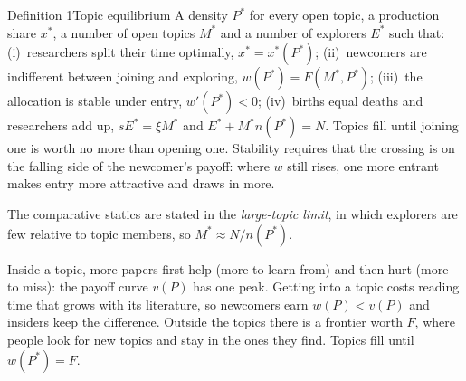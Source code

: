 \begin{resultbox}{Definition 1}{Topic equilibrium}{}
A density $P^*$ for every open topic, a production share $x^*$, a number of open topics $M^*$ and a number of explorers $E^*$ such that:
(i)~researchers split their time optimally, $x^*=x^*(P^*)$;
(ii)~newcomers are indifferent between joining and exploring, $w(P^*)=F(M^*,P^*)$;
(iii)~the allocation is stable under entry, $w'(P^*)<0$;
(iv)~births equal deaths and researchers add up, $sE^*=\xi M^*$ and $E^*+M^*n(P^*)=N$.
\tcblower
\inwords Topics fill until joining one is worth no more than opening one. Stability requires that the crossing is on the falling side of the newcomer's payoff: where $w$ still rises, one more entrant makes entry more attractive and draws in more.

The comparative statics are stated in the \emph{large-topic limit}, in which explorers are few relative to topic members, so $M^*\approx N/n(P^*)$.
\end{resultbox}

\begin{keybox}
Inside a topic, more papers first help (more to learn from) and then hurt (more to miss): the payoff curve $v(P)$ has one peak.
Getting into a topic costs reading time that grows with its literature, so newcomers earn $w(P)<v(P)$ and insiders keep the difference.
Outside the topics there is a frontier worth $F$, where people look for new topics and stay in the ones they find.
Topics fill until $w(P^*)=F$.
\end{keybox}
